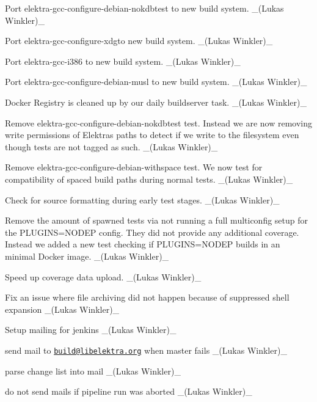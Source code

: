 \begin{DoxyItemize}
\item Port {\ttfamily elektra-\/gcc-\/configure-\/debian-\/nokdbtest} to new build system. \+\_\+(\+Lukas Winkler)\+\_\+
\item Port {\ttfamily elektra-\/gcc-\/configure-\/xdg}to new build system. \+\_\+(\+Lukas Winkler)\+\_\+
\item Port {\ttfamily elektra-\/gcc-\/i386} to new build system. \+\_\+(\+Lukas Winkler)\+\_\+
\item Port {\ttfamily elektra-\/gcc-\/configure-\/debian-\/musl} to new build system. \+\_\+(\+Lukas Winkler)\+\_\+
\item Docker Registry is cleaned up by our daily buildserver task. \+\_\+(\+Lukas Winkler)\+\_\+
\item Remove {\ttfamily elektra-\/gcc-\/configure-\/debian-\/nokdbtest} test. Instead we are now removing write permissions of Elektra\textquotesingle{}s paths to detect if we write to the filesystem even though tests are not tagged as such. \+\_\+(\+Lukas Winkler)\+\_\+
\item Remove {\ttfamily elektra-\/gcc-\/configure-\/debian-\/withspace} test. We now test for compatibility of spaced build paths during normal tests. \+\_\+(\+Lukas Winkler)\+\_\+
\item Check for source formatting during early test stages. \+\_\+(\+Lukas Winkler)\+\_\+
\item Remove the amount of spawned tests via not running a full multiconfig setup for the {\ttfamily P\+L\+U\+G\+I\+NS=N\+O\+D\+EP} config. They did not provide any additional coverage. Instead we added a new test checking if {\ttfamily P\+L\+U\+G\+I\+NS=N\+O\+D\+EP} builds in an minimal Docker image. \+\_\+(\+Lukas Winkler)\+\_\+
\item Speed up coverage data upload. \+\_\+(\+Lukas Winkler)\+\_\+
\item Fix an issue where file archiving did not happen because of suppressed shell expansion \+\_\+(\+Lukas Winkler)\+\_\+
\item Setup mailing for jenkins \+\_\+(\+Lukas Winkler)\+\_\+
\begin{DoxyItemize}
\item send mail to \href{mailto:build@libelektra.org}{\tt build@libelektra.\+org} when {\ttfamily master} fails \+\_\+(\+Lukas Winkler)\+\_\+
\item parse change list into mail \+\_\+(\+Lukas Winkler)\+\_\+
\item do not send mails if pipeline run was aborted \+\_\+(\+Lukas Winkler)\+\_\+
\end{DoxyItemize}
\end{DoxyItemize}

